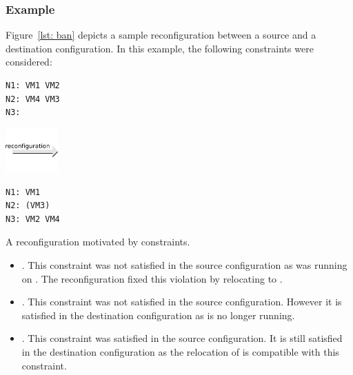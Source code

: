 \subsubsection{Example}

Figure~\ref{lst: ban} depicts a sample reconfiguration between a source and a destination configuration.
In this example, the following  constraints were considered:

\begin{reconfiguration}[htb]
\centering
\begin{minipage}[b]{0.40\textwidth}
\begin{lstlisting}
N1: VM1 VM2
N2: VM4 VM3
N3: 
\end{lstlisting}
\end{minipage}
\begin{minipage}[b]{2cm}
\includegraphics[width=2cm]{img/arrow_reconfiguration}
\end{minipage}
\begin{minipage}[b]{0.40\textwidth}
\begin{lstlisting}
N1: VM1
N2: (VM3)
N3: VM2 VM4
\end{lstlisting}
\end{minipage}
\caption{A reconfiguration motivated by  constraints.}\label{lst: ban}
\end{reconfiguration}

\begin{itemize}
\item {}. This constraint was not satisfied in the source configuration
as  was running on . The reconfiguration fixed this violation
by relocating  to .

\item {}. This constraint was not satisfied in the source configuration. However it is satisfied in the destination configuration as  is no longer running.

\item {}. This constraint was satisfied in the source configuration. It is still satisfied in the destination configuration as the relocation of  is compatible with this constraint.
\end{itemize}

